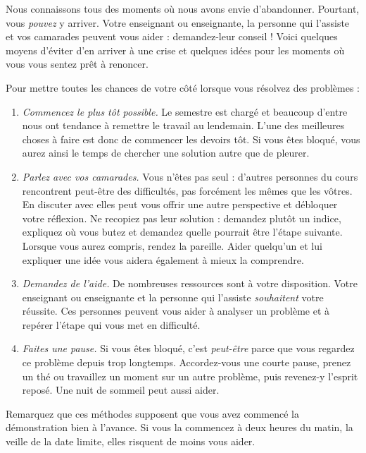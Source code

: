 \documentclass[../../../include/open-logic-section]{subfiles}
\begin{document}

Nous connaissons tous des moments où
nous avons envie d'abandonner. Pourtant,
vous \emph{pouvez} y arriver.
Votre enseignant ou enseignante,
la personne qui l'assiste et vos
camarades peuvent vous aider :
demandez-leur conseil !{} Voici
quelques moyens d'éviter d'en arriver
à une crise et quelques idées pour
les moments où vous vous sentez
prêt à renoncer.

Pour mettre toutes les chances
de votre côté lorsque vous
résolvez des problèmes :
\begin{enumerate}
\item \emph{Commencez le plus tôt possible.}
  Le semestre est chargé et beaucoup
  d'entre nous ont tendance à remettre
  le travail au lendemain. L'une des
  meilleures choses à faire est donc
  de commencer les devoirs tôt. Si
  vous êtes bloqué, vous aurez ainsi
  le temps de chercher une solution
  autre que de pleurer.
\item \emph{Parlez avec vos camarades.}
  Vous n'êtes pas seul : d'autres
  personnes du cours rencontrent
  peut-être des difficultés, pas
  forcément les mêmes que les vôtres.
  En discuter avec elles peut vous
  offrir une autre perspective et
  débloquer votre réflexion. Ne
  recopiez pas leur solution :
  demandez plutôt un indice,
  expliquez où vous butez et
  demandez quelle pourrait être
  l'étape suivante. Lorsque vous
  aurez compris, rendez la pareille.
  Aider quelqu'un et lui expliquer
  une idée vous aidera également
  à mieux la comprendre.
\item \emph{Demandez de l'aide.}
  De nombreuses ressources sont
  à votre disposition. Votre
  enseignant ou enseignante et
  la personne qui l'assiste
  \emph{souhaitent} votre réussite.
  Ces personnes peuvent vous aider à
  analyser un problème et à
  repérer l'étape qui vous
  met en difficulté.
\item \emph{Faites une pause.}
  Si vous êtes bloqué, c'est
  \emph{peut-être} parce que
  vous regardez ce problème
  depuis trop longtemps.
  Accordez-vous une courte
  pause, prenez un thé ou
  travaillez un moment sur
  un autre problème, puis
  revenez-y l'esprit reposé.
  Une nuit de sommeil peut
  aussi aider.
\end{enumerate}

Remarquez que ces méthodes supposent
que vous avez commencé la démonstration
bien à l'avance. Si vous la commencez
à deux heures du matin, la veille
de la date limite, elles risquent
de moins vous aider.
\end{document}
